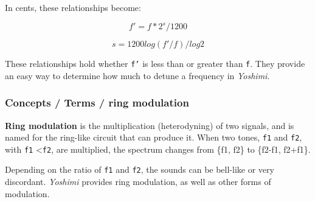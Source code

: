    In cents, these relationships become:

   \[f' = f * 2^s/1200\]

   \[s = 1200 log (f'/f) / log 2\]

   These relationships hold whether \texttt{f'} is less than or greater than
   \texttt{f}.  They provide an easy way to determine how much to detune a
   frequency in \textsl{Yoshimi}.

\subsubsection{Concepts / Terms / ring modulation}
\label{subsubsec:concepts_terms_ring_mod}

   \textbf{Ring modulation}
   is the multiplication (heterodyning) of two signals, and is named for the
   ring-like circuit that can produce it.
   When two tones, \texttt{f1} and \texttt{f2}, with 
   \texttt{f1} \textless \texttt{f2}, are multiplied, the spectrum
   changes from \{f1, f2\} to \{f2-f1, f2+f1\}.

   Depending on the ratio of \texttt{f1} and \texttt{f2}, the
   sounds can be bell-like or very discordant.
   \textsl{Yoshimi} provides ring modulation, as well as other forms of
   modulation.

